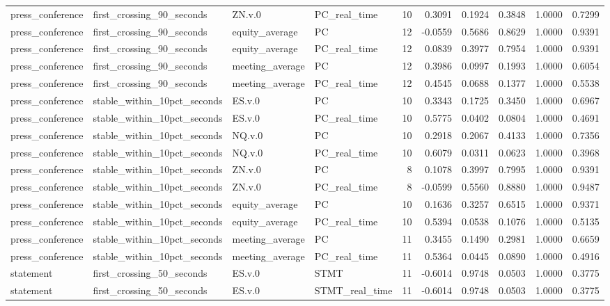 \begin{tabular}{llllrrrrrr}
press_conference & first_crossing_90_seconds & ZN.v.0 & PC_real_time & 10 & 0.3091 & 0.1924 & 0.3848 & 1.0000 & 0.7299 \\
press_conference & first_crossing_90_seconds & equity_average & PC & 12 & -0.0559 & 0.5686 & 0.8629 & 1.0000 & 0.9391 \\
press_conference & first_crossing_90_seconds & equity_average & PC_real_time & 12 & 0.0839 & 0.3977 & 0.7954 & 1.0000 & 0.9391 \\
press_conference & first_crossing_90_seconds & meeting_average & PC & 12 & 0.3986 & 0.0997 & 0.1993 & 1.0000 & 0.6054 \\
press_conference & first_crossing_90_seconds & meeting_average & PC_real_time & 12 & 0.4545 & 0.0688 & 0.1377 & 1.0000 & 0.5538 \\
press_conference & stable_within_10pct_seconds & ES.v.0 & PC & 10 & 0.3343 & 0.1725 & 0.3450 & 1.0000 & 0.6967 \\
press_conference & stable_within_10pct_seconds & ES.v.0 & PC_real_time & 10 & 0.5775 & 0.0402 & 0.0804 & 1.0000 & 0.4691 \\
press_conference & stable_within_10pct_seconds & NQ.v.0 & PC & 10 & 0.2918 & 0.2067 & 0.4133 & 1.0000 & 0.7356 \\
press_conference & stable_within_10pct_seconds & NQ.v.0 & PC_real_time & 10 & 0.6079 & 0.0311 & 0.0623 & 1.0000 & 0.3968 \\
press_conference & stable_within_10pct_seconds & ZN.v.0 & PC & 8 & 0.1078 & 0.3997 & 0.7995 & 1.0000 & 0.9391 \\
press_conference & stable_within_10pct_seconds & ZN.v.0 & PC_real_time & 8 & -0.0599 & 0.5560 & 0.8880 & 1.0000 & 0.9487 \\
press_conference & stable_within_10pct_seconds & equity_average & PC & 10 & 0.1636 & 0.3257 & 0.6515 & 1.0000 & 0.9371 \\
press_conference & stable_within_10pct_seconds & equity_average & PC_real_time & 10 & 0.5394 & 0.0538 & 0.1076 & 1.0000 & 0.5135 \\
press_conference & stable_within_10pct_seconds & meeting_average & PC & 11 & 0.3455 & 0.1490 & 0.2981 & 1.0000 & 0.6659 \\
press_conference & stable_within_10pct_seconds & meeting_average & PC_real_time & 11 & 0.5364 & 0.0445 & 0.0890 & 1.0000 & 0.4916 \\
statement & first_crossing_50_seconds & ES.v.0 & STMT & 11 & -0.6014 & 0.9748 & 0.0503 & 1.0000 & 0.3775 \\
statement & first_crossing_50_seconds & ES.v.0 & STMT_real_time & 11 & -0.6014 & 0.9748 & 0.0503 & 1.0000 & 0.3775 \\

\end{tabular}
